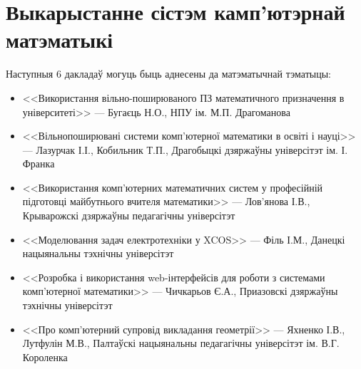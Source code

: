 \documentclass[10pt, a5paper]{article}
\begin{document}
\section{Выкарыстанне сістэм камп'ютэрнай матэматыкі}
Наступныя 6 дакладаў могуць быць аднесены да матэматычнай тэматыцы:
\begin{itemize}
\item <<Використання вільно-поширюваного ПЗ математичного призначення в університеті>> --- Бугаєць Н.О., НПУ ім. М.П. Драгоманова
\item <<Вільнопоширювані системи комп'ютерної математики в освіті і науці>> --- Лазурчак І.І., Кобильник Т.П., Драгобыцкі дзяржаўны універсітэт ім.  І. Франка
\item <<Використання комп'ютерних математичних систем у професійній підготовці майбутнього вчителя математики>> --- Лов'янова І.В., Крыварожскі дзяржаўны педагагічны універсітэт
\item <<Моделювання задач електротехніки у XCOS>> --- Філь І.М., Данецкі нацыянальны тэхнічны універсітэт
\item <<Розробка і використання web-інтерфейсів для роботи з системами комп'ютерної математики>> --- Чичкарьов Є.А., Приазовскі дзяржаўны тэхнічны універсітэт
\item <<Про комп'ютерний супровід викладання геометрії>> --- Яхненко І.В., Лутфулін М.В., Палтаўскі нацыянальны педагагічны універсітэт ім. В.Г. Короленка
\end{itemize}
\end{document}
